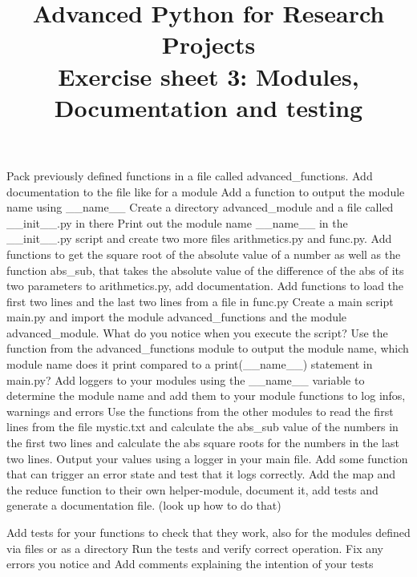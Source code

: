 \documentclass[]{erlangen-problemset}
\title{{\Large Advanced Python for Research Projects} \\[0.3cm] 
Exercise sheet 3: Modules, Documentation and testing}
\begin{document}


\begin{problem}[title={Using files and directories as modules}]
\noindent
\Question Pack previously defined functions in a file called advanced_functions.
\Question Add documentation to the file like for a module 
\Question Add a function to output the module name using \_\_name\_\_
\Question Create a directory advanced\_module and a file called \_\_init\_\_.py in there
\Question Print out the module name \_\_name\_\_ in the \_\_init\_\_.py script and create two more files arithmetics.py and func.py. 
Add functions to get the square root of the absolute value of a number as well as the function abs\_sub, that takes the absolute value of the difference of the abs of its two parameters to arithmetics.py, add documentation. 
Add functions to load the first two lines and the last two lines from a file in func.py
\Question Create a main script main.py and import the module advanced_functions and the module advanced_module. 
What do you notice when you execute the script? 
\Question Use the function from the advanced\_functions module to output the module name, which module name does it print compared to a print(\_\_name\_\_) statement in main.py?
\Question Add loggers to your modules using the \_\_name\_\_ variable to determine the module name and add them to your module functions to log infos, warnings and errors
\Question Use the functions from the other modules to read the first lines from the file mystic.txt and calculate the abs\_sub value of the numbers in the first two lines and calculate the abs square roots for the numbers in the last two lines. Output your values using a logger in your main file. 
\Question Add some function that can trigger an error state and test that it logs correctly. 
\Question Add the map and the reduce function to their own helper-module, document it, add tests and generate a documentation file. (look up how to do that)
\end{problem}


\begin{problem}[title={Building tests for our modules}]
\noindent
\Question Add tests for your functions to check that they work, also for the modules defined via files or as a directory
\Question Run the tests and verify correct operation. Fix any errors you notice and Add comments explaining the intention of your tests
\end{problem}
\end{document}
